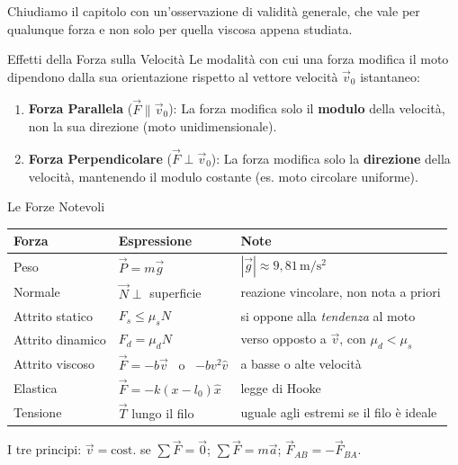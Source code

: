 Chiudiamo il capitolo con un'osservazione di validità generale, che vale per qualunque forza e non solo per quella viscosa appena studiata.

\begin{osservazione}{Effetti della Forza sulla Velocità}
Le modalità con cui una forza modifica il moto dipendono dalla sua orientazione rispetto al vettore velocità $\vec{v}_0$ istantaneo:
\begin{enumerate}
    \item \textbf{Forza Parallela} ($\vec{F} \parallel \vec{v}_0$): La forza modifica solo il \textbf{modulo} della velocità, non la sua direzione (moto unidimensionale).
    \item \textbf{Forza Perpendicolare} ($\vec{F} \perp \vec{v}_0$): La forza modifica solo la \textbf{direzione} della velocità, mantenendo il modulo costante (es. moto circolare uniforme).
\end{enumerate}
\end{osservazione}

\begin{formulario}{Le Forze Notevoli}
\centering
\renewcommand{\arraystretch}{1.55}
\begin{tabular}{@{}l l l@{}}
\toprule
\textbf{Forza} & \textbf{Espressione} & \textbf{Note} \\
\midrule
Peso                & $\vec{P} = m\vec{g}$                       & $|\vec{g}| \approx 9{,}81\,\mathrm{m/s^2}$ \\
Normale             & $\vec{N} \perp$ superficie                 & reazione vincolare, non nota a priori \\
Attrito statico     & $F_s \leq \mu_s N$                         & si oppone alla \emph{tendenza} al moto \\
Attrito dinamico    & $F_d = \mu_d N$                            & verso opposto a $\vec{v}$, con $\mu_d < \mu_s$ \\
Attrito viscoso     & $\vec{F} = -b\vec{v}$ \, o \, $-b v^2 \hat{v}$ & a basse o alte velocità \\
Elastica            & $\vec{F} = -k(x - l_0)\hat{x}$             & legge di Hooke \\
Tensione            & $\vec{T}$ lungo il filo                    & uguale agli estremi se il filo è ideale \\
\bottomrule
\end{tabular}
\vspace{4pt}

\raggedright
I tre principi: \; $\vec{v} = \text{cost.}$ se $\sum\vec{F} = \vec{0}$; \quad
$\sum\vec{F} = m\vec{a}$; \quad $\vec{F}_{AB} = -\vec{F}_{BA}$.
\end{formulario}

